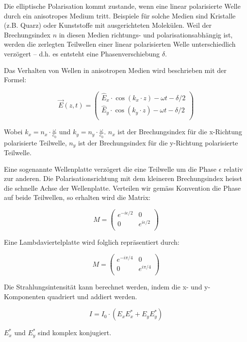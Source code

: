 Die elliptische Polarisation kommt zustande, wenn eine linear polarisierte Welle
durch ein anisotropes Medium tritt. Beispiele f\"ur solche Medien sind Kristalle
(z.B.  Quarz)  oder  Kunststoffe  mit  ausgerichteten   Molek\"ulen.   Weil  der
Brechungsindex $n$ in diesen Medien richtungs- und polarisationsabh\"angig  ist,
werden die zerlegten Teilwellen einer linear polarisierten Welle unterschiedlich
verz\"ogert  -- d.h. es entsteht eine Phasenverschiebung $\delta$.

Das Verhalten von Wellen  in anisotropen Medien wird beschrieben mit der Formel:

\begin{equation}
    \vec{E}(z,t) = \begin{pmatrix}
        \hat{E}_x\cdot\cos(k_x \cdot z) - \omega t - \delta/2 \\
        \hat{E}_y\cdot\cos(k_y \cdot z) - \omega t - \delta/2 \\
    \end{pmatrix}
\end{equation}

Wobei   $k_x   =   n_x   \cdot   \frac{\omega}{c_0}$   und  $k_y  =  n_y   \cdot
\frac{\omega}{c_0}$.   $n_x$   ist   der  Brechungsindex  f\"ur  die  x-Richtung
polarisierte Teilwelle,  $n_y$  ist  der  Brechungsindex  f\"ur  die  y-Richtung
polarisierte Teilwelle.

Eine  sogenannte  Wellenplatte  verz\"ogert  die eine  Teilwelle  um  die  Phase
$\epsilon$ relativ  zur  anderen.  Die  Polarisationsrichtung  mit dem kleineren
Brechungsindex  heisst  die  schnelle  Achse  der  Wellenplatte.  Verteilen  wir
gem\"ass Konvention die Phase auf beide Teilwellen, so erhalten wird die Matrix:

\begin{equation}
    M = \begin{pmatrix}
        e^{-i\epsilon/2} & 0 \\
        0 & e^{ i\epsilon/2} \\
    \end{pmatrix}
\end{equation}

Eine Lambdaviertelplatte wird folglich repr\"asentiert durch:

\begin{equation}
    M = \begin{pmatrix}
        e^{-i\pi/4} & 0 \\
        0 & e^{ i\pi/4} \\
    \end{pmatrix}
\end{equation}

Die Strahlungsintensit\"at kann berechnet werden, indem die x- und y-Komponenten quadriert und addiert werden.

\begin{equation}
    I = I_0 \cdot \left(E_xE^*_x + E_yE^*_y\right)
    \label{eq:intensitaet}
\end{equation}

$E_x^*$ und $E_y^*$ sind komplex konjugiert.
